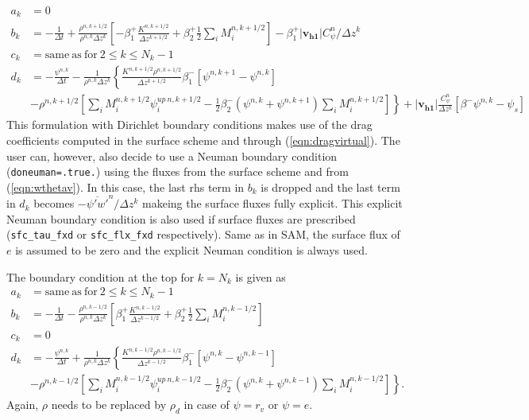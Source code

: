 \documentclass[dvipdfmx,a4paper,10pt]{article}
\begin{document}
\begin{align*}
  a_k &= 0 \\
    b_k &= -\frac{1}{\Delta t} +\frac{\rho^{n,k+1/2}}{\rho^{n,k}\Delta z^k} \left[- \beta_1^+\frac{K^{n,k+1/2}}{\Delta z^{k+1/2}}+ \beta_2^+\frac{1}{2}\sum_iM_i^{n,k+1/2} \right]-\beta_1^+|\mathbf{v_{h1}}|C^n_{\psi}/\Delta z^k  \\
      c_k &= \mathrm{same~as~for~}2\leq k \leq N_k-1 \\
      d_k &=  -\frac{\psi^{n,k}}{\Delta t} - \frac{1}{\rho^{n,k}\Delta z^k} \left\{ \frac{K^{n,k+1/2}\rho^{n,k+1/2}}{\Delta z^{k+1/2}}\beta_1^{-}\left[\psi^{n,k+1} - \psi^{n,k}\right]\right.   \\   
          & \left. -\rho^{n,k+1/2}\left[\sum_iM_i^{n,k+1/2}\psi_i^{up~n,k+1/2} - \frac{1}{2}\beta_2^{-}(\psi^{n,k}+\psi^{n,k+1})\sum_iM_i^{n,k+1/2} \right] \right\} +|\mathbf{v_{h1}}|\frac{C^n_{\psi}}{\Delta z^k}\left[\beta^-\psi^{n,k} - \psi_s\right]    
\end{align*}
This formulation with Dirichlet boundary conditions makes use of the drag coefficients computed in the surface scheme and through (\ref{eqn:dragvirtual}). The user can, however, also decide to use a Neuman boundary condition ({\tt doneuman=.true.}) using the fluxes from the surface scheme and from (\ref{eqn:wthetav}). In this case, the last rhs term in $b_k$ is dropped and the last term in $d_k$ becomes $- \overline{\psi'w'}^n/\Delta z^k$ makeing the surface fluxes fully explicit. This explicit Neuman boundary condition is also used if surface fluxes are prescribed ({\tt sfc\_tau\_fxd} or {\tt sfc\_flx\_fxd} respectively). Same as in SAM, the surface flux of $e$ is assumed to be zero and the explicit Neuman condition is always used. 

The boundary condition at the top for $k=N_k$ is given as
\begin{align*}
  a_k &= \mathrm{same~as~for~}2\leq k \leq N_k-1  \\
    b_k &= -\frac{1}{\Delta t} - \frac{\rho^{n,k-1/2}}{\rho^{n,k}\Delta z^k} \left[\beta_1^+\frac{K^{n,k-1/2}}{\Delta z ^{k-1/2}}+\beta_2^+\frac{1}{2}\sum_iM_i^{n,k-1/2} \right] \\
      c_k &= 0 \\
      d_k &= -\frac{\psi^{n,k}}{\Delta t} + \frac{1}{\rho^{n,k}\Delta z^k} \left\{ \frac{K^{n,k-1/2}\rho^{n,k-1/2}}{\Delta z^{k-1/2}}\beta_1^{-}\left[\psi^{n,k} - \psi^{n,k-1}\right]\right.   \\   
          & \left.-\rho^{n,k-1/2}\left[\sum_iM_i^{n,k-1/2}\psi_i^{up~n,k-1/2} - \frac{1}{2}\beta_2^{-}(\psi^{n,k}+\psi^{n,k-1})\sum_iM_i^{n,k-1/2} \right]\right\}.    
\end{align*}
Again, $\rho$ needs to be replaced by $\rho_d$ in case of $\psi=r_v$ or $\psi=e$. 
\end{document}
